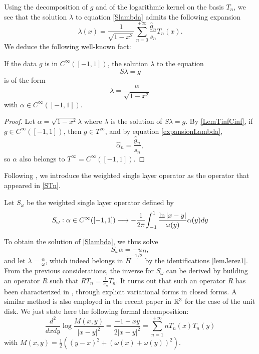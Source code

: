 \documentclass[a4paper]{article}
\begin{document}
Using the decomposition of $g$ and of the logarithmic kernel on the basis $T_n$, we see that the solution $\lambda$ to equation \eqref{Slambda} admits the following expansion 
\begin{equation}
\lambda(x) = \frac{1}{\sqrt{1-x^2}}\sum_{n=0}^{+ \infty} \frac{\hat{g}_n}{s_n} T_n(x).
\label{expansionLambda}
\end{equation}
We deduce the following well-known fact:
\begin{Cor}
	\label{CorSingularity}
	If the data $g$ is in $C^{\infty}([-1,1])$, the solution $\lambda$ to the equation 
	\[S\lambda = g\]
	is of the form 
	\[\lambda = \dfrac{\alpha}{\sqrt{1-x^2}}\]
	with $\alpha \in C^{\infty}([-1,1])$.  
	\begin{proof}
		Let $\alpha = \sqrt{1 - x^2}\lambda$ where $\lambda$ is the solution of $S\lambda = g$.  By \autoref{LemTinfCinf}, if $g \in C^{\infty}([-1,1])$, then $g \in T^{\infty}$, and by equation \eqref{expansionLambda}, 
		\[ \hat{\alpha}_n = \frac{\hat{g}_n}{s_n},\]
		so $\alpha$ also  belongs to $T^{\infty} = C^{\infty}([-1,1])$. 
	\end{proof}
\end{Cor}
\noindent Following \cite{bruno2012second}, we introduce the weighted single layer operator as the operator that appeared in \autoref{STn}.
\begin{Def}
	Let $S_\omega$ be the weighted single layer operator defined by
	\[S_\omega : \alpha \in C^{\infty}([-1,1]) \longrightarrow -\dfrac{1}{2\pi}{\int_{-1}^1\dfrac{\ln|x-y|}{\omega(y)} \alpha(y)dy}\]
\end{Def}
\noindent To obtain the solution of \eqref{Slambda}, we thus solve 
\begin{equation}
	S_\omega \alpha = -u_D,
	\label{Somegaalpha}
\end{equation}
and let $\lambda = \frac{\alpha}{\omega}$, which indeed belongs in $\tilde{H}^{-1/2}$ by the identifications \eqref{lemJerez1}. From the previous considerations, the inverse for $S_\omega$ can be derived by building an operator $R$ such that $RT_n = \frac{1}{s_n}T_n$. It turns out that such an operator $R$ has been characterized in \cite{jerez2012explicit,urzua2014optimal}, through explicit variational forms in closed forms. A similar method is also employed in the recent paper \cite{hiptmair2017closed} in $\mathbb{R}^3$ for the case of the unit disk. We just state here the following formal decomposition:
\[\dfrac{d^2}{dxdy}\log\frac{M(x,y)}{|x-y|^2} = \frac{-1+xy}{2|x-y|^2} = \sum_{n=1}^{+ \infty} n T_n(x)T_n(y)\]
with 
$M(x,y) = \frac{1}{2}\left((y-x)^2 + (\omega(x) + \omega(y))^2\right) $.
\end{document}
